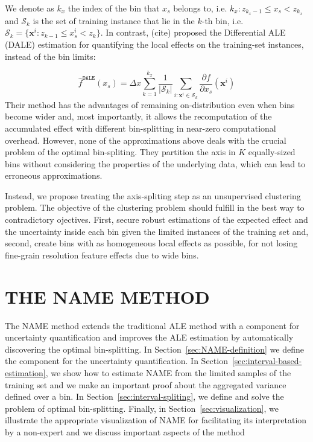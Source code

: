\documentclass[twoside]{article}
\newcommand{\xb}{\mathbf{x}}
\begin{document}
We denote as \(k_x\) the index of the bin that \(x_s\) belongs to,
i.e. \(k_x: z_{k_x-1} \leq x_s < z_{k_x} \) and \(\mathcal{S}_k\) is
the set of training instance that lie in the \(k\)-th bin, i.e.
\( \mathcal{S}_k = \{ \xb^i : z_{k-1} \leq x^i_s < z_{k} \} \). In
contrast, (cite) proposed the Differential ALE (DALE) estimation for
quantifying the local effects on the training-set instances, instead
of the bin limits:

\begin{equation}
  \label{eq:DALE_accumulated_mean_est}
  \hat{f}^{\mathtt{DALE}}(x_s) = \Delta x \sum_{k=1}^{k_x} \frac{1}{|\mathcal{S}_k|} \sum_{i:\mathbf{x}^i \in
    \mathcal{S}_k} \frac{\partial f}{\partial x_s}(\mathbf{x}^i)
\end{equation}
%
Their method has the advantages of remaining on-distribution even when
bins become wider and, most importantly, it allows the recomputation
of the accumulated effect with different bin-splitting in near-zero
computational overhead. However, none of the approximations above
deals with the crucial problem of the optimal bin-spliting. They
partition the axis in \(K\) equally-sized bins without considering the
properties of the underlying data, which can lead to erroneous
approximations.

Instead, we propose treating the axis-spliting step as an unsupervised
clustering problem. The objective of the clustering problem should
fulfill in the best way to contradictory ojectives. First, secure
robust estimations of the expected effect and the uncertainty inside
each bin given the limited instances of the training set and, second,
create bins with as homogeneous local effects as possible, for not
losing fine-grain resolution feature effects due to wide bins.

\section{THE NAME METHOD}
\label{sec:NAME-method}

The NAME method extends the traditional ALE method with a component
for uncertainty quantification and improves the ALE estimation by
automatically discovering the optimal bin-splitting. In
Section~\ref{sec:NAME-definition} we define the component for the
uncertainty quantification. In
Section~\ref{sec:interval-based-estimation}, we show how to estimate
NAME from the limited samples of the training set and we make an
important proof about the aggregated variance defined over a bin. In
Section~\ref{sec:interval-spliting}, we define and solve the problem
of optimal bin-splitting. Finally, in Section~\ref{sec:visualization},
we illustrate the appropriate visualization of NAME for facilitating
its interpretation by a non-expert and we discuss important aspects of
the method
\end{document}
